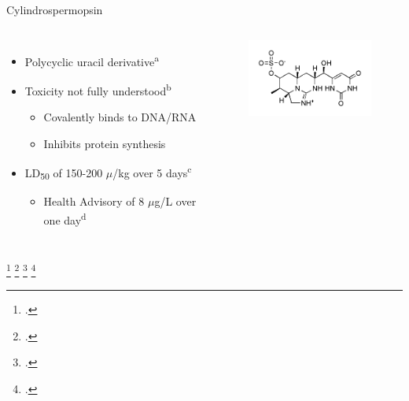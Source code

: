 \begin{frame}{Cylindrospermopsin}

\begin{columns}
	\begin{itemize}
		\item Polycyclic uracil derivative\textsuperscript{a} 
		\item Toxicity not fully understood\textsuperscript{b}
			\begin{itemize}
				\item Covalently binds to DNA/RNA 
				\item Inhibits protein synthesis %
			\end{itemize}
		\item LD\textsubscript{50} of 150-200 $\mu$/kg over 5 days\textsuperscript{c}
			\begin{itemize}
				\item Health Advisory of 8 $\mu$g/L over one day\textsuperscript{d}
			\end{itemize}
	\end{itemize}
	\begin{figure}
		\centering
		\includegraphics[width=2in]{cylindro.png}
	\end{figure}
\end{columns}
\footcitetext{[a], moreira_cylindrospermopsin:_2013}
\footcitetext{[b], kittler_1._2014}
\footcitetext{[c], shaw_cylindrospermopsin_2000}
\footcitetext{[d], usepa_draft_2016}
\end{frame}
